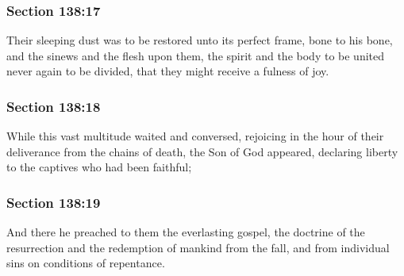 	\subsubsection{Section 138:17} %
		\label{DC138-17}

		Their sleeping dust was to be restored unto its perfect frame, bone to his bone, and the sinews and the flesh upon them, the spirit and the body to be united never again to be divided, that they might receive a fulness of joy.


	\subsubsection{Section 138:18} %
		\label{DC138-18}

		While this vast multitude waited and conversed, rejoicing in the hour of their deliverance from the chains of death, the Son of God appeared, declaring liberty to the captives who had been faithful;


	\subsubsection{Section 138:19} %
		\label{DC138-19}

		And there he preached to them the everlasting gospel, the doctrine of the resurrection and the redemption of mankind from the fall, and from individual sins on conditions of repentance.


